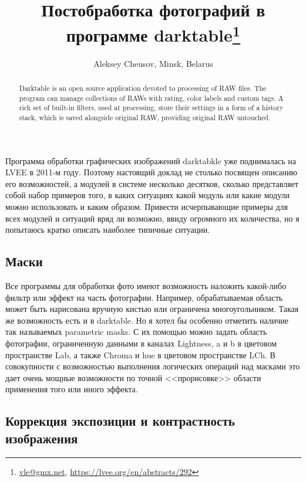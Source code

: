\documentclass[10pt, a5paper]{article}
\begin{document}
\title{Постобработка фотографий в программе darktable\footnote{\url{vle@gmx.net}, \url{https://lvee.org/en/abstracts/292}}}
\author{Aleksey Cheusov, Minsk, Belarus}
\maketitle
\begin{abstract}
Darktable is an open source application devoted to processing of RAW
files. The program can manage collections of RAWs with rating, color
labels and custom tags. A rich set of built-in filters, used at
processing, store their settings in a form of a history stack, which
is saved alongside original RAW, providing original RAW
untouched.
\end{abstract}
Программа обработки графических изображений darktabkle уже поднималась
на LVEE в 2011-м году. Поэтому настоящий доклад не столько посвящен
описанию его возможностей, а модулей в системе несколько десятков,
сколько представляет собой набор примеров того, в каких ситуациях
какой модуль или какие модули можно использовать и каким
образом. Привести исчерпывающие примеры для всех модулей и ситуаций
вряд ли возможно, ввиду огромного их количества, но я попытаюсь кратко
описать наиболее типичные ситуации.

\subsection*{Маски}

Все программы для обработки фото имеют возможность наложить какой-либо
фильтр или эффект на часть фотографии. Например, обрабатываемая
область может быть нарисована вручную кистью или ограничена
многоугольником. Такая же возможность есть и в darktable. Но я хотел
бы особенно отметить наличие так называемых parametric masks. С их
помощью можно задать область фотографии, ограниченную данными в
каналах Lightness, a и b в цветовом пространстве Lab, а также Chroma и
hue в цветовом пространстве LCh. В совокупности с возможностью
выполнения логических операций над масками это дает очень мощные
возможности по точной <<прорисовке>> области применения того или иного
эффекта.

\subsection*{Коррекция экспозиции и контрастность изображения}
\end{document}
